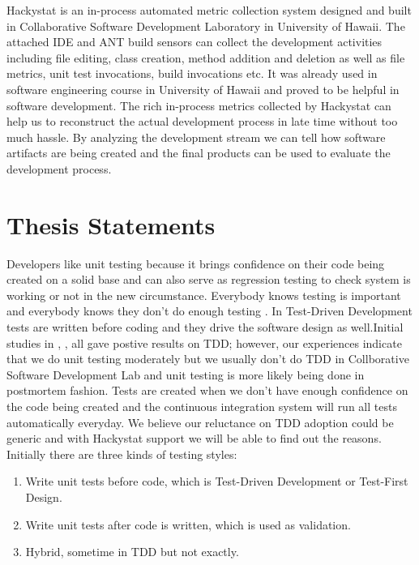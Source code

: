 \documentclass[11pt,twocolumn]{article}
\begin{document}
Hackystat is an in-process automated metric collection system designed and
built in Collaborative Software Development Laboratory in University of
Hawaii. The attached IDE and ANT build sensors can collect the development
activities including file editing, class creation, method addition and
deletion as well as file metrics, unit test invocations, build invocations
etc. It was already used in software engineering course in University of
Hawaii and proved to be helpful in software development. The rich
in-process metrics collected by Hackystat can help us to reconstruct the
actual development process in late time without too much hassle. By
analyzing the development stream we can tell how software artifacts
are being created and the final products can be used to evaluate the
development process.

\section{Thesis Statements}
\label{sec:statement}

Developers like unit testing because it brings confidence \cite{Hunt:03} on
their code being created on a solid base and can also serve as regression
testing to check system is working or not in the new circumstance.
Everybody knows testing is important and everybody knows they don't do
enough testing \cite{Beck:00}.  In Test-Driven Development tests are
written before coding and they drive the software design as well.Initial
studies in \cite{Edwards:04}, \cite{George:2003}, \cite{Maximilien:2003}
all gave postive results on TDD; however, our experiences indicate that we
do unit testing moderately but we usually don't do TDD in Collborative
Software Development Lab and unit testing is more likely being done in
postmortem fashion. Tests are created when we don't have enough confidence
on the code being created and the continuous integration system will run
all tests automatically everyday. We believe our reluctance on TDD adoption
could be generic and with Hackystat support we will be able to find out the
reasons. Initially there are three kinds of testing styles:

\begin{enumerate}
\item Write unit tests before code, which is Test-Driven Development or
Test-First Design.
\item Write unit tests after code is written, which is used as validation. 
\item Hybrid, sometime in TDD but not exactly.
\end{enumerate}
\end{document}

